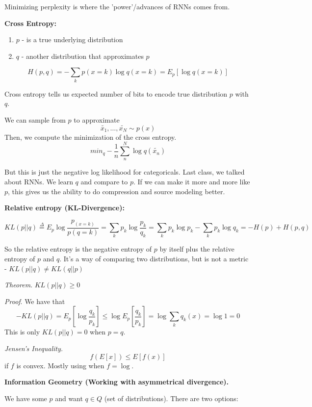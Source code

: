 \documentclass{article}
\begin{document}
Minimizing perplexity is where the 'power'/advances of RNNs comes from.

\smallskip
\textbf{Cross Entropy:}

\begin{enumerate}
\item $p$ - is a true underlying distribution
\item $q$ - another distribution that approximates $p$
\end{enumerate}

$$H(p, q) = - \sum_k p(x=k) \log q(x=k) = E_p[\log q(x=k)]$$

Cross entropy tells us expected number of bits to encode true distribution $p$ with $q$.

\smallskip
We can sample from $p$ to approximate
$$\tilde{x_1}, \ldots, \tilde{x_N} \sim p(x)$$
Then, we compute the minimization of the cross entropy.
$$min_q - \frac{1}{n} \sum_{n}^N \log q(\tilde{x_n})$$

\smallskip
But this is just the negative log likelihood for categoricals. Last class, we talked about RNNs. We learn $q$ and compare to $p$. If we can make it more and more like $p$, this gives us the ability to do compression and source modeling better.


\smallskip 
\smallskip
\textbf{Relative entropy (KL-Divergence):}

$$KL(p || q) \overset{\Delta}{=} E_p \log \frac{p_(x=k)}{p(q=k)} = \sum_k p_k \log \frac{p_k}{q_k} = \sum_k p_k \log p_k - \sum_k p_k \log q_k = -H(p) + H(p,q)$$

So the relative entropy is the negative entropy of $p$ by itself plus the relative entropy of $p$ and $q$. It's a way of comparing two distributions, but is not a metric - $KL(p || q) \neq KL(q || p)$

\smallskip
\smallskip
\textit{Theorem}. $KL(p||q) \geq 0$

\textit{Proof}. We have that
$$-KL(p||q) = E_p [\log \frac{q_k}{p_k}] \leq \log E_p[ \frac{q_k}{p_k} ] = \log \sum_k q_k(x) = \log 1 = 0$$
This is only $KL(p||q) = 0$ when $p = q$. 

\smallskip
\smallskip
\textit{Jensen's Inequality.}
$$f(E[x]) \leq E[f(x)]$$
if $f$ is convex. Mostly using when $f = \log$. 

\smallskip
\smallskip
\textbf{Information Geometry (Working with asymmetrical divergence).}

We have some $p$ and want $q \in Q$ (set of distributions). There are two options: 
\end{document}
